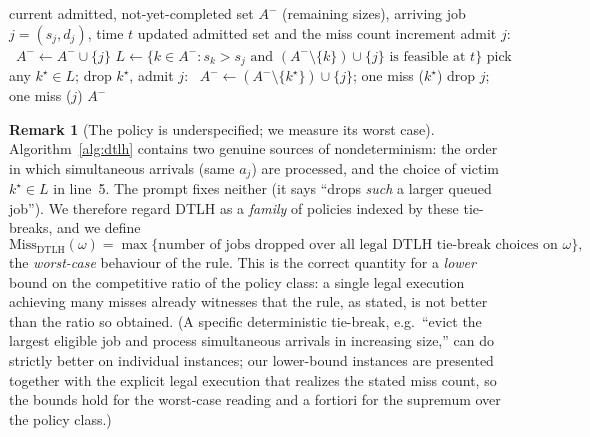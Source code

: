 \documentclass{amsart}
\theoremstyle{definition}
\newtheorem{remark}[theorem]{Remark}
\begin{document}
\begin{algorithm}[h]
\caption{DTLH admission decision at the arrival of job $j$ at time $t$}
\label{alg:dtlh}
\begin{algorithmic}[1]
\Require current admitted, not-yet-completed set $A^-$ (remaining sizes), arriving job $j=(s_j,d_j)$, time $t$
\Ensure updated admitted set and the miss count increment
  \State admit $j$: \ $A^-\gets A^-\cup\{j\}$
\Else
  \State $L\gets\{k\in A^- : s_k> s_j \text{ and } (A^-\setminus\{k\})\cup\{j\}\text{ is feasible at }t\}$
    \State pick any $k^\star\in L$; drop $k^\star$, admit $j$: \ $A^-\gets(A^-\setminus\{k^\star\})\cup\{j\}$; one miss ($k^\star$)
  \Else
    \State drop $j$; one miss ($j$)
  \EndIf
\EndIf
\State \Return $A^-$
\end{algorithmic}
\end{algorithm}

\begin{remark}[The policy is underspecified; we measure its worst case]
\label{rem:tiebreak}
Algorithm~\ref{alg:dtlh} contains two genuine sources of nondeterminism: the
order in which simultaneous arrivals (same $a_j$) are processed, and the choice
of victim $k^\star\in L$ in line~5. The prompt fixes neither (it says ``drops
\emph{such} a larger queued job''). We therefore regard DTLH as a \emph{family}
of policies indexed by these tie-breaks, and we define
\[
\mathrm{Miss}_{\mathrm{DTLH}}(\omega)
=\max\{\text{number of jobs dropped over all legal DTLH tie-break choices on }\omega\},
\]
the \emph{worst-case} behaviour of the rule. This is the correct quantity for a
\emph{lower} bound on the competitive ratio of the policy class: a single legal
execution achieving many misses already witnesses that the rule, as stated, is
not better than the ratio so obtained. (A specific deterministic tie-break, e.g.\
``evict the largest eligible job and process simultaneous arrivals in increasing
size,'' can do strictly better on individual instances; our lower-bound
instances are presented together with the explicit legal execution that realizes
the stated miss count, so the bounds hold for the worst-case reading and a
fortiori for the supremum over the policy class.)
\end{remark}
\end{document}
